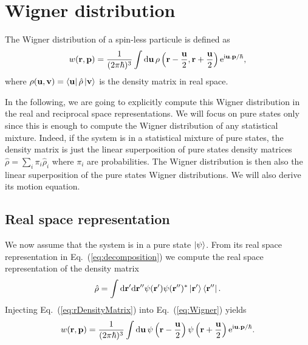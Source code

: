\section{Wigner distribution}

The Wigner distribution of a spin-less particule is defined as
\begin{equation}
	\label{eq:Wigner}
	w(\mathbf{ r }, \mathbf{ p }) = \frac{1}{(2\pi\hbar)^3} \int \mathrm{d}\mathbf{ u } \, \rho\left( \mathbf{ r }-\frac{\mathbf{ u }}{2} , \mathbf{ r }+\frac{\mathbf{ u }}{2} \right) \mathrm{e}^{\mathrm{i} \mathbf{ u }.\mathbf{ p }/\hbar } ,
\end{equation}
where $\rho(\mathbf{ u },\mathbf{ v }) = \left\langle \mathbf{ u } \right| \hat{\rho} \left| \mathbf{ v } \right\rangle$ is the density matrix in real space.

In the following, we are going to explicitly compute this Wigner distribution in the real and reciprocal space representations.
We will focus on pure states only since this is enough to compute the Wigner distribution of any statistical mixture. Indeed, if the system is in a statistical mixture of pure states, the density matrix is just the linear superposition of pure states density matrices $\hat{\rho} = \sum_i \pi_i \hat{\rho}_i$ where $\pi_i$ are probabilities. The Wigner distribution is then also the linear superposition of the pure states Wigner distributions.
We will also derive its motion equation.



\subsection{Real space representation}

We now assume that the system is in a pure state $\left| \psi \right\rangle$.
From its real space representation in Eq.~(\ref{eq:decomposition}) we compute the real space representation of the density matrix
\begin{equation}
	\label{eq:rDensityMatrix}
	\hat{\rho} = \int \mathrm{d}\mathbf{ r' }\mathrm{d}\mathbf{ r'' } \psi(\mathbf{ r' }) \psi(\mathbf{ r'' })^{\ast} \left| \mathbf{ r' } \right\rangle\left\langle \mathbf{ r'' } \right| .
\end{equation}
Injecting Eq.~(\ref{eq:rDensityMatrix}) into Eq.~(\ref{eq:Wigner}) yields
\begin{equation}
	\label{eq:rWigner}
	w(\mathbf{ r }, \mathbf{ p }) = \frac{1}{(2\pi\hbar)^3} \int \mathrm{d}\mathbf{ u } \, \psi\left( \mathbf{ r }-\frac{\mathbf{ u }}{2} \right) \psi\left( \mathbf{ r }+\frac{\mathbf{ u }}{2} \right) \mathrm{e}^{\mathrm{i} \mathbf{ u }.\mathbf{ p }/\hbar } .
\end{equation}



